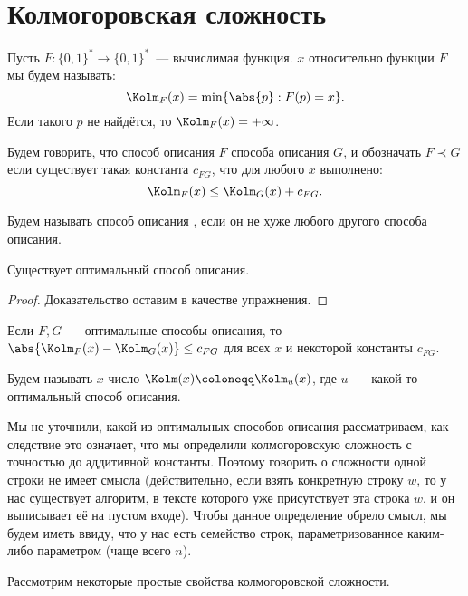 \section{Колмогоровская сложность}

\begin{definition}
    Пусть $F\colon \{0, 1\}^{*} \to \{0, 1\}^{*}$~--- вычислимая функция. 
    $x$ относительно  функции $F$ мы будем называть:
    $$
        \Kolm_F(x) = \min\{\abs{p} : F(p) = x\}.
    $$ 
    Если такого $p$ не найдётся, то $\Kolm_F(x) = +\infty$.
    
    Будем говорить, что способ описания $F$  способа описания $G$, и обозначать $F \prec
    G$ если существует такая константа $c_{FG}$, что для любого $x$ выполнено:
    $$
        \Kolm_F(x) \le \Kolm_G(x) + c_{FG}.
    $$

    Будем называть способ описания , если он не хуже любого другого способа
    описания.
\end{definition}

\begin{theorem}
    Существует оптимальный способ описания.
\end{theorem}

\begin{proof}
    Доказательство оставим в качестве упражнения.
\end{proof}

Если $F, G$~--- оптимальные способы описания, то $\abs{\Kolm_F(x) - \Kolm_G(x)} \le c_{FG}$ для всех $x$
и некоторой константы $c_{FG}$.

\begin{definition}
    Будем называть  $x$ число $\Kolm(x) \coloneqq \Kolm_u(x)$, где
    $u$~--- какой-то оптимальный способ описания.
\end{definition}

Мы не уточнили, какой из оптимальных способов описания рассматриваем, как следствие это означает, что мы
определили колмогоровскую сложность с точностью до аддитивной константы. Поэтому говорить о сложности
одной строки не имеет смысла (действительно, если взять конкретную строку $w$, то у нас существует
алгоритм, в тексте которого уже присутствует эта строка $w$, и он выписывает её на пустом входе). 
Чтобы данное определение обрело смысл, мы будем иметь ввиду, что у нас есть семейство строк,
параметризованное каким-либо параметром (чаще всего $n$).

Рассмотрим некоторые простые свойства колмогоровской сложности.

